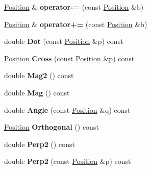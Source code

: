 \begin{DoxyCompactItemize}
\item 
\hypertarget{classPosition_a2d414d082486e40bef80c1ae3f3d05e7}{\hyperlink{classPosition}{Position} \& {\bfseries operator-\/=} (const \hyperlink{classPosition}{Position} \&b)}\label{classPosition_a2d414d082486e40bef80c1ae3f3d05e7}

\item 
\hypertarget{classPosition_ad2bd309438b9410f3e02b01f6d3db5bc}{\hyperlink{classPosition}{Position} \& {\bfseries operator+=} (const \hyperlink{classPosition}{Position} \&b)}\label{classPosition_ad2bd309438b9410f3e02b01f6d3db5bc}

\item 
\hypertarget{classPosition_a7b9b6ac6629131398f2928360f20eb08}{double {\bfseries Dot} (const \hyperlink{classPosition}{Position} \&p) const }\label{classPosition_a7b9b6ac6629131398f2928360f20eb08}

\item 
\hypertarget{classPosition_ad00bec35610db4f6955a473e24fb7cbb}{\hyperlink{classPosition}{Position} {\bfseries Cross} (const \hyperlink{classPosition}{Position} \&p) const }\label{classPosition_ad00bec35610db4f6955a473e24fb7cbb}

\item 
\hypertarget{classPosition_a03df8eb4c0cc7c341a5424f622faa655}{double {\bfseries Mag2} () const }\label{classPosition_a03df8eb4c0cc7c341a5424f622faa655}

\item 
\hypertarget{classPosition_a5166f113ddb9e5f116ac4e3f6bd638c5}{double {\bfseries Mag} () const }\label{classPosition_a5166f113ddb9e5f116ac4e3f6bd638c5}

\item 
\hypertarget{classPosition_a3140c87b9934338c610c39b8fd300384}{double {\bfseries Angle} (const \hyperlink{classPosition}{Position} \&q) const }\label{classPosition_a3140c87b9934338c610c39b8fd300384}

\item 
\hypertarget{classPosition_afea0aaa9328d8831f89fc491a3fe1cdc}{\hyperlink{classPosition}{Position} {\bfseries Orthogonal} () const }\label{classPosition_afea0aaa9328d8831f89fc491a3fe1cdc}

\item 
\hypertarget{classPosition_ac343878fec78550e928730f27b11cd39}{double {\bfseries Perp2} () const }\label{classPosition_ac343878fec78550e928730f27b11cd39}

\item 
\hypertarget{classPosition_aea7d37f6f8c91f121bd3b814ed0a057f}{double {\bfseries Perp2} (const \hyperlink{classPosition}{Position} \&p) const }\label{classPosition_aea7d37f6f8c91f121bd3b814ed0a057f}

\end{DoxyCompactItemize}

